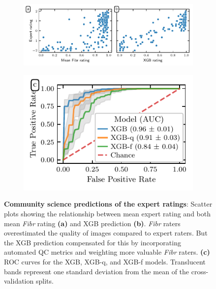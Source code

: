 \documentclass[fleqn,10pt,inline]{wlscirep}
\begin{document}
\begin{figure}[tbp]
    {\label{fig:fibr-qc:scatter:fibr}}
    {\label{fig:fibr-qc:scatter:xgb}}
    {\label{fig:fibr-qc:roc}}
    \begin{subfigure}{.63\linewidth}
    \centering
    \includegraphics[width=\linewidth]{community-qc/fibr-rating-scatter-plot.pdf}
    \end{subfigure}
    \begin{subfigure}{.37\linewidth}
    \centering
    \includegraphics[width=\linewidth]{community-qc/xgb-roc-curve.pdf}
    \end{subfigure}
    \caption{%
        {\bf Community science predictions of the expert ratings}:
        Scatter plots showing the relationship between mean expert rating and
        both mean \emph{Fibr} rating \textbf{(a)} and XGB prediction
        \textbf{(b)}. \emph{Fibr} raters overestimated the quality of images
        compared to expert raters. But the XGB prediction compensated for this
        by incorporating automated QC metrics and weighting more valuable
        \emph{Fibr} raters.
        \textbf{(c)} ROC curves for the XGB, XGB-q, and XGB-f models.
        Translucent bands represent one standard deviation from the mean
        of the cross-validation splits.
    }
    \label{fig:fibr-qc}
\end{figure}
\end{document}
